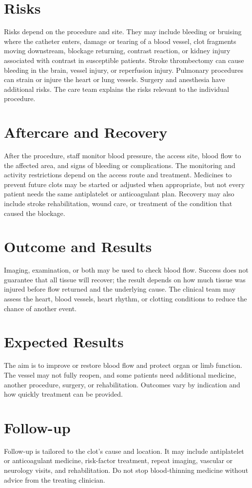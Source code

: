 \section*{Risks}
Risks depend on the procedure and site. They may include bleeding or bruising where the catheter enters, damage or tearing of a blood vessel, clot fragments moving downstream, blockage returning, contrast reaction, or kidney injury associated with contrast in susceptible patients. Stroke thrombectomy can cause bleeding in the brain, vessel injury, or reperfusion injury. Pulmonary procedures can strain or injure the heart or lung vessels. Surgery and anesthesia have additional risks. The care team explains the risks relevant to the individual procedure.

\section*{Aftercare and Recovery}
After the procedure, staff monitor blood pressure, the access site, blood flow to the affected area, and signs of bleeding or complications. The monitoring and activity restrictions depend on the access route and treatment. Medicines to prevent future clots may be started or adjusted when appropriate, but not every patient needs the same antiplatelet or anticoagulant plan. Recovery may also include stroke rehabilitation, wound care, or treatment of the condition that caused the blockage.

\section*{Outcome and Results}
Imaging, examination, or both may be used to check blood flow. Success does not guarantee that all tissue will recover; the result depends on how much tissue was injured before flow returned and the underlying cause. The clinical team may assess the heart, blood vessels, heart rhythm, or clotting conditions to reduce the chance of another event.

\section*{Expected Results}
The aim is to improve or restore blood flow and protect organ or limb function. The vessel may not fully reopen, and some patients need additional medicine, another procedure, surgery, or rehabilitation. Outcomes vary by indication and how quickly treatment can be provided.

\section*{Follow-up}
Follow-up is tailored to the clot's cause and location. It may include antiplatelet or anticoagulant medicine, risk-factor treatment, repeat imaging, vascular or neurology visits, and rehabilitation. Do not stop blood-thinning medicine without advice from the treating clinician.


